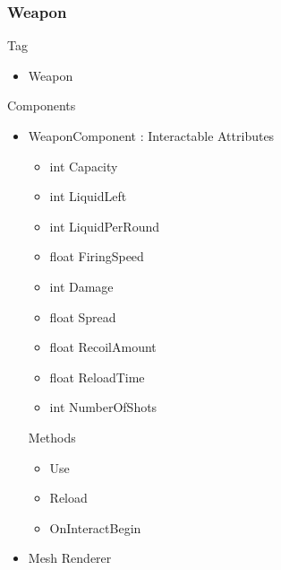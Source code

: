 \documentclass[11pt]{article}
\begin{document}
\subsubsection{Weapon}
Tag
\begin{itemize}
	\item Weapon
\end{itemize}
Components
\begin{itemize}
	\item WeaponComponent : Interactable
	\newline Attributes
	\begin{itemize}
		\item int Capacity
		\item int LiquidLeft
		\item int LiquidPerRound
		\item float FiringSpeed
		\item int Damage
		\item float Spread
		\item float RecoilAmount
		\item float ReloadTime
		\item int NumberOfShots
	\end{itemize}
	Methods
	\begin{itemize}
		\item Use
		\item Reload
		\item OnInteractBegin
	\end{itemize}
	\item Mesh Renderer
\end{itemize}
\end{document}
